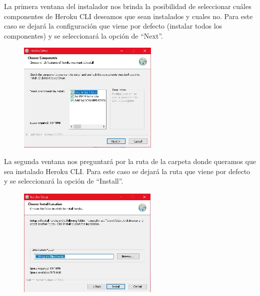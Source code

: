 \documentclass[10pt,a4paper]{article} %
\begin{document}
\begin{enumerate}
{			
			\vspace{0.5cm}
			La primera ventana del instalador nos brinda la posibilidad de seleccionar cu{\'a}les componentes de Heroku CLI deseamos que sean instalados y cuales no. Para este caso se dejar{\'a} la configuraci{\'o}n que viene por defecto (instalar todos los componentes) y se seleccionar{\'a} la opci{\'o}n de ``Next''.
			\begin{figure}[H]
				\includegraphics[width=0.6\textwidth]{3.jpg}
				\centering
				\label{img:paso3}
			\end{figure}
			\item La segunda ventana nos preguntar{\'a} por la ruta de la carpeta donde queramos que sea instalado Heroku CLI. Para este caso se dejar{\'a} la ruta que viene por defecto y se seleccionar{\'a} la opci{\'o}n de ``Install''.
			\begin{figure}[H]
				\includegraphics[width=0.6\textwidth]{4.jpg}
				\centering
				\label{img:paso4}
			\end{figure}
			
			\pagebreak    
			
}
\end{enumerate}
\end{document}
